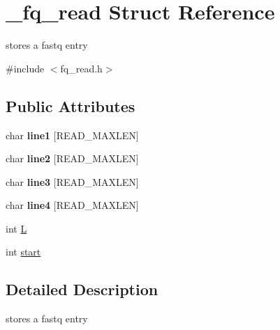 \hypertarget{struct__fq__read}{\section{\+\_\+fq\+\_\+read Struct Reference}
\label{struct__fq__read}
}


stores a fastq entry  




{\ttfamily \#include $<$fq\+\_\+read.\+h$>$}

\subsection*{Public Attributes}
\begin{DoxyCompactItemize}
\item 
\hypertarget{struct__fq__read_a7a643c49516b3a35f221d0fcda7f9ff3}{char {\bfseries line1} \mbox{[}R\+E\+A\+D\+\_\+\+M\+A\+X\+L\+E\+N\mbox{]}}\label{struct__fq__read_a7a643c49516b3a35f221d0fcda7f9ff3}

\item 
\hypertarget{struct__fq__read_af2502a6f97e9508936c1b9f08890cc84}{char {\bfseries line2} \mbox{[}R\+E\+A\+D\+\_\+\+M\+A\+X\+L\+E\+N\mbox{]}}\label{struct__fq__read_af2502a6f97e9508936c1b9f08890cc84}

\item 
\hypertarget{struct__fq__read_a3df48e8dc31e47dc36c371002dba1bb5}{char {\bfseries line3} \mbox{[}R\+E\+A\+D\+\_\+\+M\+A\+X\+L\+E\+N\mbox{]}}\label{struct__fq__read_a3df48e8dc31e47dc36c371002dba1bb5}

\item 
\hypertarget{struct__fq__read_a8074fd734cb7e3d4b87454417aea569a}{char {\bfseries line4} \mbox{[}R\+E\+A\+D\+\_\+\+M\+A\+X\+L\+E\+N\mbox{]}}\label{struct__fq__read_a8074fd734cb7e3d4b87454417aea569a}

\item 
int \hyperlink{struct__fq__read_a746efa9093b5223e85ffb7274e7693ef}{L}
\item 
int \hyperlink{struct__fq__read_a0b8deb6c25c72026b4928b17e3f12ade}{start}
\end{DoxyCompactItemize}


\subsection{Detailed Description}
stores a fastq entry 


